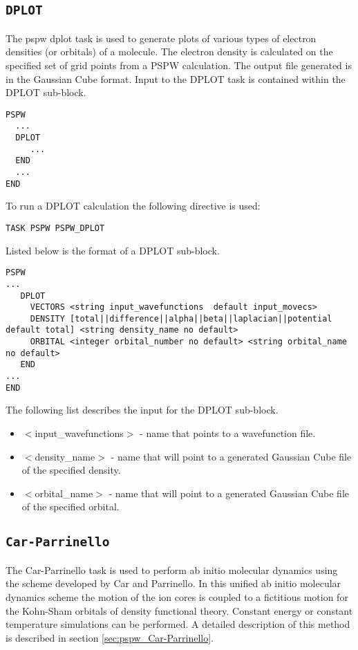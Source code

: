 \subsection{\tt DPLOT}
\label{sec:pspw_dplot}
The pspw dplot task is used to generate plots of various types of electron
densities (or orbitals) of a molecule.  The electron density is calculated on the 
specified set of grid points from a PSPW calculation.  The output file
generated is in the Gaussian Cube format.
Input to the DPLOT task is contained
within the DPLOT sub-block.
\begin{verbatim}
PSPW
  ...
  DPLOT
     ...
  END
  ...
END
\end{verbatim}
To run a DPLOT calculation the following directive 
is used:
\begin{verbatim}
TASK PSPW PSPW_DPLOT
\end{verbatim}
Listed below is the format of a DPLOT sub-block.
\begin{verbatim}
PSPW
... 
   DPLOT
     VECTORS <string input_wavefunctions  default input_movecs>  
     DENSITY [total||difference||alpha||beta||laplacian||potential default total] <string density_name no default>
     ORBITAL <integer orbital_number no default> <string orbital_name no default>
   END
...
END
\end{verbatim}
The following list describes the input for the DPLOT
sub-block.
\begin{itemize}
        \item $<$input\_wavefunctions$>$ - name that points
              to a wavefunction file.
        \item $<$density\_name$>$ - name that will 
              point to a generated Gaussian Cube file of the specified density.
        \item $<$orbital\_name$>$ - name that will 
              point to a generated Gaussian Cube file of the specified orbital.
\end{itemize}


\subsection{\tt Car-Parrinello}
\label{sec:pspw_CP}
The Car-Parrinello task is used to perform ab initio molecular dynamics
using the scheme developed by Car and Parrinello.  In this unified ab
initio molecular dynamics scheme the motion of the ion cores is coupled to
a fictitious motion for the Kohn-Sham orbitals of density functional
theory.  Constant energy or constant temperature simulations can be
performed.  A detailed description of this method
is described in section \ref{sec:pspw_Car-Parrinello}.

